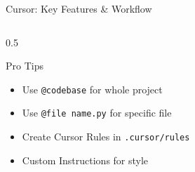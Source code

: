 \documentclass[aspectratio=169,11pt]{beamer}
\begin{document}
\begin{frame}{Cursor: Key Features \& Workflow}
\begin{columns}[T]
\begin{column}{0.5\textwidth}
            \begin{block}{Pro Tips}
                \begin{itemize}
                    \item Use \texttt{@codebase} for whole project
                    \item Use \texttt{@file name.py} for specific file
                    \item Create Cursor Rules in \texttt{.cursor/rules}
                    \item Custom Instructions for style
                \end{itemize}
            \end{block}
        \end{column}
    \end{columns}

\end{frame}
\end{document}
